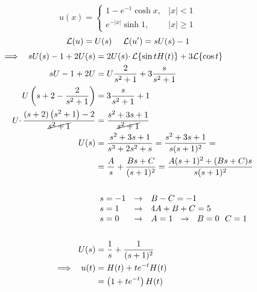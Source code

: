 \begin{equation*}
u( x) =\begin{cases}
1-e^{-1}\cosh x, & | x| < 1\\
e^{-| x| }\sinh 1, & | x| \geqslant 1
\end{cases}
\end{equation*}
\Soluzione
\begin{equation*}
\mathcal{L}( u) =U( s) \ \ \ \ \mathcal{L}( u') =sU( s) -1
\end{equation*}
\begin{align*}
\implies \ \ sU( s) -1+2U( s) & =2U( s) \cdotp \mathcal{L}\{\sin tH( t)\} +3\mathcal{L}\{\cos t\}\\
sU-1+2U & =U\frac{2}{s^{2} +1} +3\frac{s}{s^{2} +1}\\
U\left( s+2-\frac{2}{s^{2} +1}\right) & =3\frac{s}{s^{2} +1} +1\\
U\cdotp \frac{( s+2)\left( s^{2} +1\right) -2}{\cancel{s^{2} +1}} & =\frac{s^{2} +3s+1}{\cancel{s^{2} +1}}\\
U( s) & =\frac{s^{2} +3s+1}{s^{3} +2s^{2} +s} =\frac{s^{2} +3s+1}{s( s+1)^{2}} =\\
 & =\frac{A}{s} +\frac{Bs+C}{( s+1)^{2}} =\frac{A( s+1)^{2} +( Bs+C) s}{s( s+1)^{2}}\\
 & \\
 & \begin{array}{ l c l }
s=-1 & \rightarrow  & B-C=-1\\
s=1 & \rightarrow  & 4A+B+C=5\\
s=0 & \rightarrow  & A=1\ \ \rightarrow \ \ B=0\ \ C=1
\end{array}\\
 & \ \ \ \ \\
U( s) & =\frac{1}{s} +\frac{1}{( s+1)^{2}}\\
\implies \ \ u( t) & =H( t) +te^{-t} H( t)\\
 & =\left( 1+te^{-t}\right) H( t)
\end{align*}
\Soluzione

